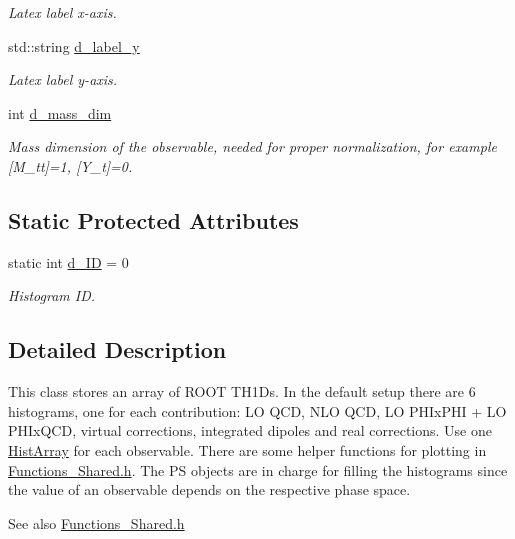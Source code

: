 \begin{DoxyCompactItemize}
\begin{DoxyCompactList}\small\item\em Latex label x-\/axis. \end{DoxyCompactList}\item 
\hypertarget{classHistArray_a884c9ad37bb3bc65bed3c33928c12f7d}{}std\+::string \hyperlink{classHistArray_a884c9ad37bb3bc65bed3c33928c12f7d}{d\+\_\+label\+\_\+y}\label{classHistArray_a884c9ad37bb3bc65bed3c33928c12f7d}

\begin{DoxyCompactList}\small\item\em Latex label y-\/axis. \end{DoxyCompactList}\item 
\hypertarget{classHistArray_ac682fdf0aeedf8f0b9fb8c4c4b1fee71}{}int \hyperlink{classHistArray_ac682fdf0aeedf8f0b9fb8c4c4b1fee71}{d\+\_\+mass\+\_\+dim}\label{classHistArray_ac682fdf0aeedf8f0b9fb8c4c4b1fee71}

\begin{DoxyCompactList}\small\item\em Mass dimension of the observable, needed for proper normalization, for example \mbox{[}M\+\_\+tt\mbox{]}=1, \mbox{[}Y\+\_\+t\mbox{]}=0. \end{DoxyCompactList}\end{DoxyCompactItemize}
\subsection*{Static Protected Attributes}
\begin{DoxyCompactItemize}
\item 
\hypertarget{classHistArray_a01616b3115c8b243e2bd924788d47589}{}static int \hyperlink{classHistArray_a01616b3115c8b243e2bd924788d47589}{d\+\_\+\+I\+D} = 0\label{classHistArray_a01616b3115c8b243e2bd924788d47589}

\begin{DoxyCompactList}\small\item\em Histogram I\+D. \end{DoxyCompactList}\end{DoxyCompactItemize}


\subsection{Detailed Description}
This class stores an array of R\+O\+O\+T T\+H1\+D\textquotesingle{}s. In the default setup there are 6 histograms, one for each contribution\+: L\+O Q\+C\+D, N\+L\+O Q\+C\+D, L\+O P\+H\+Ix\+P\+H\+I + L\+O P\+H\+Ix\+Q\+C\+D, virtual corrections, integrated dipoles and real corrections. Use one \hyperlink{classHistArray}{Hist\+Array} for each observable. There are some helper functions for plotting in \hyperlink{Functions__Shared_8h}{Functions\+\_\+\+Shared.\+h}. The P\+S objects are in charge for filling the histograms since the value of an observable depends on the respective phase space. \begin{DoxySeeAlso}{See also}
\hyperlink{Functions__Shared_8h}{Functions\+\_\+\+Shared.\+h} 
\end{DoxySeeAlso}


